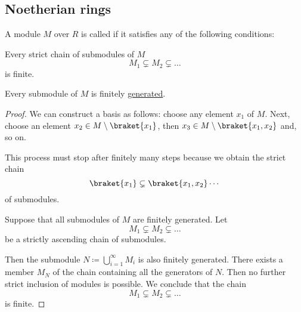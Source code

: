 \subsection{Noetherian rings}\label{subsec:noetherian_rings}

\begin{definition}\label{def:noetherian_module}
  A module \( M \) over \( R \) is called  if it satisfies any of the following conditions:
  \begin{thmenum}
     Every strict chain of submodules of \( M \)
    \begin{equation*}
      M_1 \subsetneq M_2 \subsetneq \ldots
    \end{equation*}
    is finite.

     Every submodule of \( M \) is finitely \hyperref[def:free_semimodule]{generated}.
  \end{thmenum}
\end{definition}
\begin{proof}
   We can construct a basis as follows: choose any element \( x_1 \) of \( M \). Next, choose an element \( x_2 \in M \setminus \braket {x_1} \), then \( x_3 \in M \setminus \braket {x_1, x_2} \) and, so on.

  This process must stop after finitely many steps because we obtain the strict chain
  \begin{equation*}
    \braket {x_1} \subsetneq \braket {x_1, x_2} \cdots
  \end{equation*}
  of submodules.

   Suppose that all submodules of \( M \) are finitely generated. Let
  \begin{equation*}
    M_1 \subsetneq M_2 \subsetneq \ldots
  \end{equation*}
  be a strictly ascending chain of submodules.

  Then the submodule \( N \coloneqq \bigcup_{i=1}^\infty M_i \) is also finitely generated. There exists a member \( M_N \) of the chain containing all the generators of \( N \). Then no further strict inclusion of modules is possible. We conclude that the chain
  \begin{equation*}
    M_1 \subsetneq M_2 \subsetneq \ldots
  \end{equation*}
  is finite.
\end{proof}

